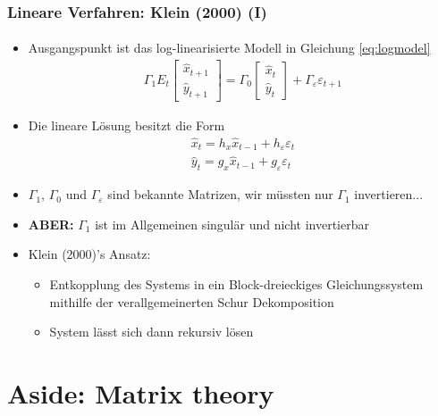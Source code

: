 \documentclass[10pt]{beamer}  %
\begin{document}
\begin{frame}
\frametitle{Lineare Verfahren: Klein (2000) (I)}\framesubtitle{}
\begin{itemize}
  \item Ausgangspunkt ist das log-linearisierte Modell in Gleichung \eqref{eq:logmodel}
  \begin{align*}
 \Gamma_1 E_t\begin{bmatrix}\hat{x}_{t+1}\\\hat{y}_{t+1}\end{bmatrix} = \Gamma_0 \begin{bmatrix}\hat{x}_{t}\\\hat{y}_{t}\end{bmatrix} + \Gamma_\varepsilon \varepsilon_{t+1}\label{eq:logmodel}
  \end{align*}
  \item Die lineare L\"{o}sung besitzt die Form
  \begin{align*}
  \hat{x}_{t} = h_x \hat{x}_{t-1} + h_\varepsilon \varepsilon_{t}\\
  \hat{y}_{t} = g_x \hat{x}_{t-1} + g_\varepsilon \varepsilon_{t}
  \end{align*}
  \item $\Gamma_1$, $\Gamma_0$ und $\Gamma_\varepsilon$ sind bekannte Matrizen, wir m\"{u}ssten nur $\Gamma_1$ invertieren...
\item \textbf{ABER:} $\Gamma_1$ ist im Allgemeinen singul\"{a}r und nicht invertierbar
  \item Klein (2000)'s Ansatz:
  \begin{itemize}
      \item Entkopplung des Systems in ein Block-dreieckiges Gleichungssystem mithilfe der verallgemeinerten Schur Dekomposition
      \item System l\"{a}sst sich dann rekursiv l\"{o}sen
  \end{itemize}
\end{itemize}
\end{frame}


\section{Aside: Matrix theory}
\end{document}

